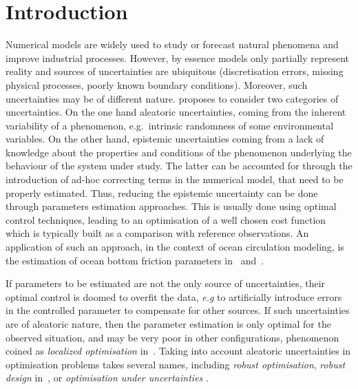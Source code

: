 \documentclass[preprint, review, 1p]{elsarticle}
\newcommand{\arthur}[1]{{\itshape\color{cyan} ({#1})}}
\begin{document}

\section{Introduction}
\label{sec:intro}

Numerical models are widely used to study or forecast natural phenomena and improve industrial processes. However, by essence models only partially represent reality and sources of uncertainties are ubiquitous (discretisation errors, missing physical processes, poorly known boundary conditions).
%
Moreover, such uncertainties may be of different nature. 
\cite{walker_defining_2003} proposes to consider two categories of uncertainties. On the one hand aleatoric uncertainties,  coming from the inherent variability of a phenomenon, e.g.\ intrinsic randomness of some environmental variables. On the other hand, epistemic uncertainties coming from a lack of knowledge about the properties and conditions of the phenomenon underlying the behaviour of the system under study.
The latter can be accounted for through the introduction of ad-hoc correcting terms in the numerical model, that need to be properly estimated. Thus, reducing the epistemic uncertainty can be done through parameters estimation approaches. 
This is usually done using optimal control techniques, leading to an optimisation of a well chosen cost function which is typically built as a comparison with reference observations.
%
An application of such an approach, in the context of ocean circulation modeling, is the estimation of ocean bottom friction parameters in~\cite{das_estimation_1991} and~\cite{boutet_estimation_2015}. 


If parameters to be estimated are not the only source of uncertainties, their optimal control 
is doomed to overfit the data, \emph{e.g} to artificially introduce errors in the controlled parameter to compensate for other sources. If such uncertainties are of aleatoric nature, then the parameter estimation is only optimal for the observed situation, and may be very poor in other configurations, phenomenon coined as \textit{localized optimisation} in~\cite{huyse_free-form_2001}.
Taking into account aleatoric uncertainties in optimisation problems takes several names, including \textit{robust optimisation}, \textit{robust design} in~\cite{lelievre_consideration_2016}, or \textit{optimisation under uncertainties} \citep{petrone_robustness_2011, seshadri_density-matching_2014,cook_horsetail_2018}. 
\end{document}
